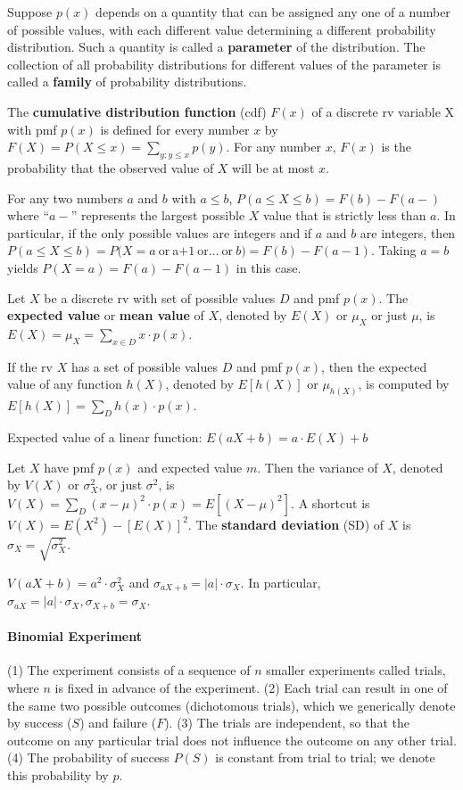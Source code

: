 \documentclass[paper=A4, pagesize, fontsize=6.95pt, DIV=calc]{scrartcl}
\begin{document}
Suppose $p(x)$ depends on a quantity that can be assigned any one of a number of possible values, with each different value determining a different probability distribution. Such a quantity is called a \textbf{parameter} of the distribution. The collection of all probability distributions for different values of the parameter is called a \textbf{family} of probability distributions.

The \textbf{cumulative distribution function} (cdf) $F(x)$ of a discrete rv variable X with pmf $p(x)$ is defined for every number $x$ by $F(X) = P(X \le x) = \sum_{y: y\le x}p(y)$. For any number $x$, $F(x)$ is the probability that the observed value of $X$ will be at most $x$.

For any two numbers $a$ and $b$ with $a \le b$, $P(a \le X \le b) = F(b) - F(a-)$  where ``$a-$'' represents the largest possible $X$ value that is strictly less than $a$. In particular, if the only possible values are integers and if $a$ and $b$ are integers, then $P(a \le X \le b) = P(X = a\ \text{or}\ $a$ + 1\ \text{or}\ldots\ \text{or}\ b) = F(b) - F(a - 1)$. Taking $a = b$ yields $P(X = a) = F(a) - F(a - 1)$ in this case.

Let $X$ be a discrete rv with set of possible values $D$ and pmf $p(x)$. The \textbf{expected value} or \textbf{mean value} of $X$, denoted by $E(X)$ or $\mu_{X}$ or just $\mu$, is $E(X) = \mu_{X} = \sum_{x \in D}x \cdot p(x)$.

If the rv $X$ has a set of possible values $D$ and pmf $p(x)$, then the expected value of any function $h(X)$, denoted by $E[h(X)]$ or $\mu_{h(X)}$, is computed by $E[h(X)] = \sum_{D}h(x) \cdot p(x)$.

Expected value of a linear function: $E(aX + b) = a \cdot E(X) + b$

Let $X$ have pmf $p(x)$ and expected value $m$. Then the variance of $X$, denoted by $V(X)$ or $\sigma_X^2$, or just $\sigma^2$, is $V(X) = \sum_{D}(x - \mu)^2 \cdot p(x) = E[(X - \mu)^2]$. A shortcut is $V(X) = E(X^2) - [E(X)]^2$. The \textbf{standard deviation} (SD) of $X$ is $\sigma_X = \sqrt{\sigma_X^2}$.

$V(aX + b) = a^2 \cdot \sigma_X^2$ and $\sigma_{aX + b} = |a| \cdot \sigma_X$. In particular, $\sigma_{aX} = |a| \cdot \sigma_X, \sigma_{X + b} = \sigma_X$.

\paragraph{Binomial Experiment}
(1) The experiment consists of a sequence of $n$ smaller experiments called trials, where $n$ is fixed in advance of the experiment. (2) Each trial can result in one of the same two possible outcomes (dichotomous trials), which we generically denote by success ($S$) and failure ($F$). (3) The trials are independent, so that the outcome on any particular trial does not influence the outcome on any other trial. (4) The probability of success $P(S)$ is constant from trial to trial; we denote this probability by $p$.
\end{document}
